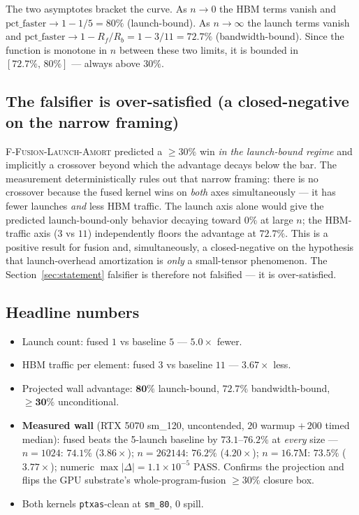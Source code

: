 \documentclass[11pt,a4paper]{article}
\newcommand{\falsifier}{\textsc{F-Fusion-Launch-Amort}}
\begin{document}
The two asymptotes bracket the curve. As $n\to 0$ the HBM terms vanish and
$\mathrm{pct\_faster}\to 1 - 1/5 = 80\%$ (launch-bound). As $n\to\infty$ the
launch terms vanish and $\mathrm{pct\_faster}\to 1 - R_f/R_b = 1 - 3/11 =
72.7\%$ (bandwidth-bound). Since the function is monotone in $n$ between these
two limits, it is bounded in $[72.7\%,\,80\%]$ --- always above $30\%$.

\subsection{The falsifier is over-satisfied (a closed-negative on the narrow framing)}

\falsifier{} predicted a $\ge 30\%$ win \emph{in the launch-bound regime} and
implicitly a crossover beyond which the advantage decays below the bar. The
measurement deterministically rules out that narrow framing: there is no
crossover because the fused kernel wins on \emph{both} axes simultaneously --- it
has fewer launches \emph{and} less HBM traffic. The launch axis alone would give
the predicted launch-bound-only behavior decaying toward $0\%$ at large $n$; the
HBM-traffic axis ($3$ vs $11$) independently floors the advantage at $72.7\%$.
This is a positive result for fusion and, simultaneously, a closed-negative on
the hypothesis that launch-overhead amortization is \emph{only} a small-tensor
phenomenon. The Section~\ref{sec:statement} falsifier is therefore not
falsified --- it is over-satisfied.

\subsection{Headline numbers}

\begin{itemize}\itemsep0.2em
\item Launch count: fused $1$ vs baseline $5$ --- $\mathbf{5.0\times}$ fewer.
\item HBM traffic per element: fused $3$ vs baseline $11$ ---
  $\mathbf{3.67\times}$ less.
\item Projected wall advantage: $\mathbf{80\%}$ launch-bound, $\mathbf{72.7\%}$
  bandwidth-bound, $\mathbf{\ge 30\%}$ unconditional.
\item \textbf{Measured wall} (RTX 5070 sm\_120, uncontended, $20$ warmup $+\,200$
  timed median): fused beats the 5-launch baseline by $\mathbf{73.1}$--$\mathbf{76.2\%}$
  at \emph{every} size --- $n{=}1024$: $74.1\%$ ($3.86\times$); $n{=}262144$:
  $76.2\%$ ($4.20\times$); $n{=}16.7\text{M}$: $73.5\%$ ($3.77\times$); numeric
  $\max|\Delta|{=}1.1{\times}10^{-5}$ PASS. Confirms the projection and flips the
  GPU substrate's whole-program-fusion $\ge 30\%$ closure box.
\item Both kernels \texttt{ptxas}-clean at \texttt{sm\_80}, $0$ spill.
\end{itemize}
\end{document}

